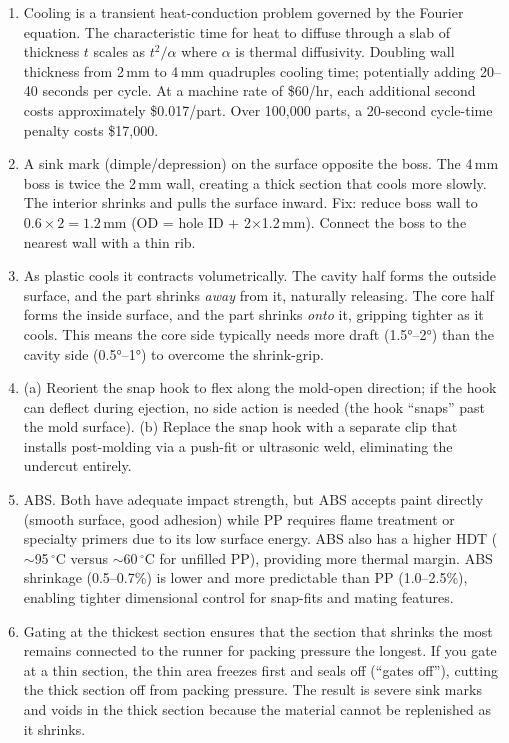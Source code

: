 \begin{enumerate}[leftmargin=1.5em]
  \item Cooling is a transient heat-conduction problem governed by the Fourier equation. The characteristic time for heat to diffuse through a slab of thickness $t$ scales as $t^2 / \alpha$ where $\alpha$ is thermal diffusivity. Doubling wall thickness from 2\,mm to 4\,mm quadruples cooling time; potentially adding 20--40 seconds per cycle. At a machine rate of \$60/hr, each additional second costs approximately \$0.017/part. Over 100,000 parts, a 20-second cycle-time penalty costs \$17,000.

  \item A sink mark (dimple/depression) on the surface opposite the boss. The 4\,mm boss is twice the 2\,mm wall, creating a thick section that cools more slowly. The interior shrinks and pulls the surface inward. Fix: reduce boss wall to $0.6 \times 2 = 1.2$\,mm (OD = hole ID + 2$\times$1.2\,mm). Connect the boss to the nearest wall with a thin rib.

  \item As plastic cools it contracts volumetrically. The cavity half forms the outside surface, and the part shrinks \emph{away} from it, naturally releasing. The core half forms the inside surface, and the part shrinks \emph{onto} it, gripping tighter as it cools. This means the core side typically needs more draft (\ang{1.5}--\ang{2}) than the cavity side (\ang{0.5}--\ang{1}) to overcome the shrink-grip.

  \item (a) Reorient the snap hook to flex along the mold-open direction; if the hook can deflect during ejection, no side action is needed (the hook ``snaps'' past the mold surface). (b) Replace the snap hook with a separate clip that installs post-molding via a push-fit or ultrasonic weld, eliminating the undercut entirely.

  \item ABS. Both have adequate impact strength, but ABS accepts paint directly (smooth surface, good adhesion) while PP requires flame treatment or specialty primers due to its low surface energy. ABS also has a higher HDT ($\sim$95\,$^{\circ}$C versus $\sim$60\,$^{\circ}$C for unfilled PP), providing more thermal margin. ABS shrinkage (0.5--0.7\%) is lower and more predictable than PP (1.0--2.5\%), enabling tighter dimensional control for snap-fits and mating features.

  \item Gating at the thickest section ensures that the section that shrinks the most remains connected to the runner for packing pressure the longest. If you gate at a thin section, the thin area freezes first and seals off (``gates off''), cutting the thick section off from packing pressure. The result is severe sink marks and voids in the thick section because the material cannot be replenished as it shrinks.


\end{enumerate}
